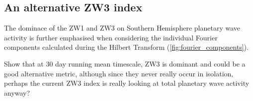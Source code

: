\subsection{An alternative ZW3 index}

The dominace of the ZW1 and ZW3 on Southern Hemisphere planetary wave activity is further emphasised when considering the individual Fourier components calculated during the Hilbert Transform (\ref{fig:fourier_components}).


Show that at 30 day running mean timescale, ZW3 is dominant and could be a good alternative metric, although since they never really occur in isolation, perhaps the current ZW3 index is really looking at total planetary wave activity anyway?